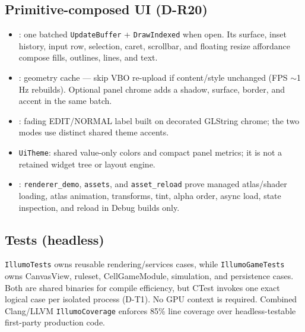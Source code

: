 \subsection{Primitive-composed UI (D-R20)}
\begin{itemize}
  \item {}: one batched \texttt{UpdateBuffer} +
        \texttt{DrawIndexed} when open. Its surface, inset history, input row,
        selection, caret, scrollbar, and floating resize affordance compose
         fills, outlines, lines, and text.
  \item {}: geometry cache --- skip VBO re-upload if
        content/style unchanged (FPS $\sim$1\,Hz rebuilds). Optional panel
        chrome adds a shadow, surface, border, and accent in the same batch.
  \item {}: fading EDIT/NORMAL label built on decorated
        GLString chrome; the two modes use distinct shared theme accents.
  \item \texttt{UiTheme}: shared value-only colors and compact panel metrics;
        it is not a retained widget tree or layout engine.
  \item {}: \texttt{renderer\_demo}, \texttt{assets}, and
        \texttt{asset\_reload} prove managed atlas/shader loading, atlas
        animation, transforms, tint, alpha order, async load, state inspection,
        and reload in Debug builds only.
\end{itemize}

\subsection{Tests (headless)}
\texttt{IllumoTests} owns reusable rendering/services cases, while
\texttt{IllumoGameTests} owns CanvasView, ruleset, CellGameModule, simulation,
and persistence cases. Both are shared binaries for compile efficiency, but
CTest invokes one exact logical case per isolated process (D-T1). No GPU
context is required. Combined Clang/LLVM \texttt{IllumoCoverage} enforces 85\%
line coverage over headless-testable first-party production code.

